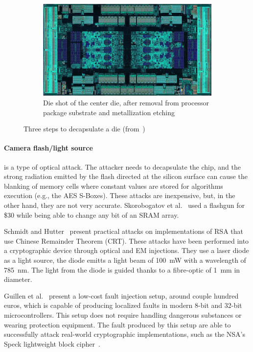 \begin{figure}[ht]
\begin{subfigure}[b]{0.3\textwidth}
    \end{subfigure}
    \hfill
    \begin{subfigure}[b]{0.3\textwidth}
        \includegraphics[width=\textwidth]{c2_soa/img/epyc_7702_packagedRemoved.jpg}
        \caption{Die shot of the center die, after removal from processor package substrate and metallization etching}
        \label{fig:packagedRemoved_die}
    \end{subfigure}
    \caption{Three steps to decapsulate a die (from~\cite{decapping-19-wikipedia})}
    \label{fig:decapsulating_die}
\end{figure}


\paragraph{Camera flash/light source} is a type of optical attack. The attacker needs to decapsulate the chip, and the strong radiation emitted by the flash directed at the silicon surface can cause the blanking of memory cells where constant values are stored for algorithms execution (e.g., the AES S-Boxes). These attacks are inexpensive, but, in the other hand, they are not very accurate. Skorobogatov et al.~\cite{SA-02-ches} used a flashgun for \$30 while being able to change any bit of an SRAM array.

Schmidt and Hutter~\cite{SH-07-austrochip} present practical attacks on implementations of RSA that use Chinese Remainder Theorem (CRT). These attacks have been performed into a cryptographic device through optical and EM injections. They use a laser diode  as a light source, the diode emitts a light  beam of 100~mW with a wavelength of 785~nm. The light from the diode is guided thanks to a fibre-optic of 1~mm in diameter.

Guillen et al.~\cite{GGD-17-cosade} present a low-cost fault injection setup, around couple hundred euros, which is capable of producing localized faults in modern 8-bit and 32-bit microcontrollers. This setup does not require handling dangerous substances or wearing protection equipment. The fault produced by this setup are able to successfully attack real-world cryptographic implementations, such as the NSA’s Speck lightweight block cipher~\cite{RDJSBL-13-nsa}.

